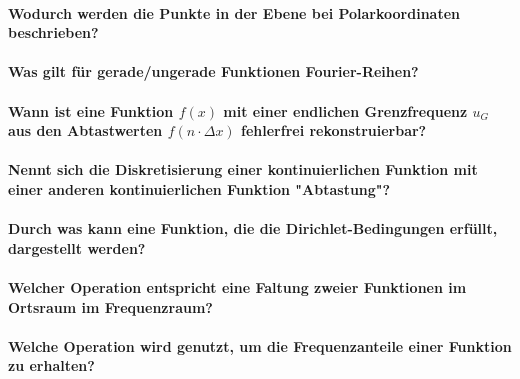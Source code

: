 \paragraph{Wodurch werden die Punkte in der Ebene bei Polarkoordinaten beschrieben?}

\paragraph{Was gilt für gerade/ungerade Funktionen \bzgl Fourier-Reihen?}

\paragraph{Wann ist eine Funktion \(f(x)\) mit einer endlichen Grenzfrequenz \(u_G\) aus den Abtastwerten \(f(n \cdot \Delta x)\) fehlerfrei rekonstruierbar?}

\paragraph{Nennt sich die Diskretisierung einer kontinuierlichen Funktion mit einer anderen kontinuierlichen Funktion "Abtastung"?}

\paragraph{Durch was kann eine Funktion, die die Dirichlet-Bedingungen erfüllt, dargestellt werden?}

\paragraph{Welcher Operation entspricht eine Faltung zweier Funktionen im Ortsraum im Frequenzraum?}

\paragraph{Welche Operation wird genutzt, um die Frequenzanteile einer Funktion zu erhalten?}

